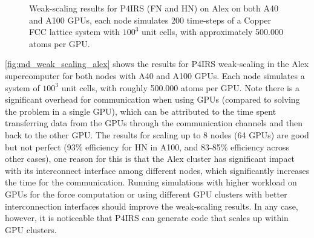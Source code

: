 \documentclass[preprint,12pt]{elsarticle}
\begin{document}
\begin{figure}[t]
\centering
{}
\vspace{-3ex}
\caption{Weak-scaling results for P4IRS (FN and HN) on Alex on both A40 and A100 GPUs, each node simulates 200 time-steps of a Copper FCC lattice system with $100^3$ unit cells, with approximately 500.000 atoms per GPU.}
\vspace{-2ex}
\label{fig:md_weak_scaling_alex}
\end{figure}

\autoref{fig:md_weak_scaling_alex} shows the results for P4IRS weak-scaling in the Alex supercomputer for both nodes with A40 and A100 GPUs.
Each node simulates a system of $100^3$ unit cells, with roughly 500.000 atoms per GPU.
Note there is a significant overhead for communication when using GPUs (compared to solving the problem in a single GPU), which can be attributed to the time spent transferring data from the GPUs through the communication channels and then back to the other GPU.
The results for scaling up to 8 nodes (64 GPUs) are good but not perfect (93\% efficiency for \ac{HN} in A100, and 83-85\% efficiency across other cases), one reason for this is that the Alex cluster has significant impact with its interconnect interface among different nodes, which significantly increases the time for the communication.
Running simulations with higher workload on GPUs for the force computation or using different GPU clusters with better interconnection interfaces should improve the weak-scaling results.
In any case, however, it is noticeable that P4IRS can generate code that scales up within GPU clusters.
\end{document}
